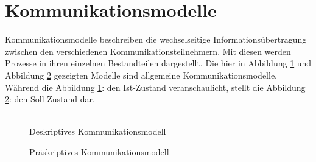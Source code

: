 \section{Kommunikationsmodelle}
Kommunikationsmodelle beschreiben die wechselseitige Informationsübertragung zwischen den verschiedenen Kommunikationsteilnehmern. Mit diesen werden Prozesse in ihren einzelnen Bestandteilen dargestellt. Die hier in Abbildung \ref{img:deskriptiv} und Abbildung \ref{img:präskriptiv} gezeigten Modelle sind allgemeine Kommunikationsmodelle. Während die Abbildung \ref{img:deskriptiv}:  den Ist-Zustand veranschaulicht, stellt die Abbildung \ref{img:präskriptiv}:  den Soll-Zustand dar.\\\\
\begin{figure}[H]
	\centering
	\setlength{\fboxsep}{1pt}
	\setlength{\fboxrule}{1pt}
	\captionsetup{justification=centering}
	\caption{Deskriptives Kommunikationsmodell}
	\label{img:deskriptiv}
\end{figure}
\begin{figure}[H]
	\centering
	\setlength{\fboxsep}{1pt}
	\setlength{\fboxrule}{1pt}
	\captionsetup{justification=centering}
	\caption{Präskriptives Kommunikationsmodell}
	\label{img:präskriptiv}
\end{figure}
